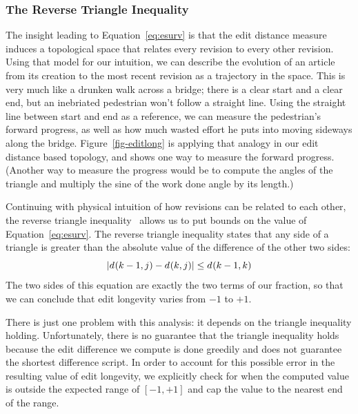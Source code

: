 \subsubsection{The Reverse Triangle Inequality}

The insight leading to Equation~\ref{eq:esurv} is that the edit distance
measure induces a topological space that relates every revision to
every other revision.
Using that model for our intuition, we can describe the evolution of
an article from its creation to the most recent revision as a trajectory
in the space.
This is very much like a drunken walk across a bridge;
there is a clear start and a clear end, but an inebriated
pedestrian won't follow a straight line.
Using the straight line between start and end as a reference,
we can measure the pedestrian's forward progress, as well as
how much wasted effort he puts into moving sideways along the bridge.
Figure~\ref{fig-editlong} is applying that analogy in our
edit distance based topology, and shows one way to measure
the forward progress.
(Another way to measure the progress would be to compute the
angles of the triangle and multiply the sine of the
work done angle by its length.)

Continuing with physical intuition of how revisions can be
related to each other, the reverse triangle
inequality~\cite{wiki:TriangleInequality} allows us to put bounds
on the value of Equation~\ref{eq:esurv}.
The reverse triangle inequality states that any side of
a triangle is greater than the absolute value of the difference
of the other two sides:
\begin{equation}
| d_{}(k-1,j) - d_{}(k,j) | \le d_{}(k-1,k)
\end{equation}
The two sides of this equation are exactly the two terms
of our fraction, so that we can conclude that edit longevity
varies from $-1$ to $+1$.

There is just one problem with this analysis: it depends on
the triangle inequality holding.
Unfortunately, there is no guarantee that the triangle inequality
holds because the edit difference we compute is done greedily
and does not guarantee the shortest difference script.
In order to account for this possible error in the resulting
value of edit longevity, we explicitly check for when the
computed value is outside the expected range of $[-1, +1]$
and cap the value to the nearest end of the range.


